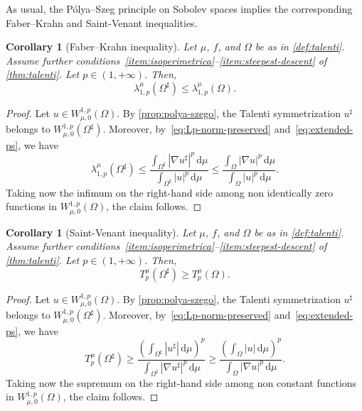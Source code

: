 \documentclass[a4paper,12pt,reqno]{amsart}
\numberwithin{equation}{section}
\renewcommand{\H}{\mathcal{H}}
\newcommand{\di}{\,\mathrm{d}}
\newcommand{\Om}{\Omega}
\theoremstyle{plain}
\newtheorem{corollary}[theorem]{Corollary}
\theoremstyle{definition}
\begin{document}
As usual, the P\'olya--Szeg\H{o} principle on Sobolev spaces implies the corresponding Faber--Krahn and Saint-Venant inequalities.

\begin{corollary}[Faber--Krahn inequality]
\label{cor:fk-ineq}
Let $\mu$, $f$, and $\Omega$ be as in \cref{def:talenti}. Assume further conditions~\ref{item:isoperimetrica}--\ref{item:steepest-descent} of \cref{thm:talenti}. Let $p\in(1,+\infty)$. Then,
\begin{equation*}
    \lambda^\mu_{1,p}(\Om^\sharp)\leq \lambda_{1,p}^\mu(\Om).
\end{equation*}
%
\end{corollary}

\begin{proof}
Let $u \in W^{1,p}_{\mu,0}(\Om)$. By \cref{prop:polya-szego}, the Talenti symmetrization $u^\sharp$ belongs to $ W^{1,p}_{\mu,0}(\Om^\sharp)$. Moreover, by~\eqref{eq:Lp-norm-preserved} and~\eqref{eq:extended-ps}, we have
\[
\lambda^\mu_{1,p}(\Om^\sharp)\leq \frac{\displaystyle\int_{\Om^\sharp}|\nabla u^\sharp|^p\di \mu}{\displaystyle\int_{\Om^\sharp}|u|^p\di\mu}\leq \frac{\displaystyle\int_\Om|\nabla u|^p\di \mu}{\displaystyle\int_\Om|u|^p\di\mu}.
\]
 Taking now the infimum on the right-hand side among non identically zero functions in $W^{1,p}_{\mu,0}(\Om)$, the claim follows.
\end{proof}

\begin{corollary}[Saint-Venant inequality]
\label{cor:sv-ineq}
Let $\mu$, $f$, and $\Omega$ be as in \cref{def:talenti}. Assume further conditions~\ref{item:isoperimetrica}--\ref{item:steepest-descent} of \cref{thm:talenti}. Let $p\in(1,+\infty)$. Then,
\begin{equation*}
    T^\mu_{p}(\Om^\sharp)\geq T_{p}^\mu(\Om).
\end{equation*}
%
\end{corollary}

\begin{proof}
Let $u \in W^{1,p}_{\mu,0}(\Om)$. By \cref{prop:polya-szego}, the Talenti symmetrization $u^\sharp$ belongs to $ W^{1,p}_{\mu,0}(\Om^\sharp)$. Moreover, by~\eqref{eq:Lp-norm-preserved} and~\eqref{eq:extended-ps}, we have
\[
T^\mu_{p}(\Om^\sharp)\geq \frac{\left(\displaystyle\int_{\Om^\sharp}|u^\sharp|\di \mu\right)^{p}}{\displaystyle\int_{\Om^\sharp}|\nabla u^\sharp|^p\di \mu}
\geq
\frac{\left(\displaystyle\int_\Om|u|\di \mu\right)^{p}}{\displaystyle\int_\Om|\nabla u|^p\di \mu}.
\]
Taking now the supremum on the right-hand side among non constant functions in $W^{1,p}_{\mu,0}(\Om)$, the claim follows.
\end{proof}
\end{document}
